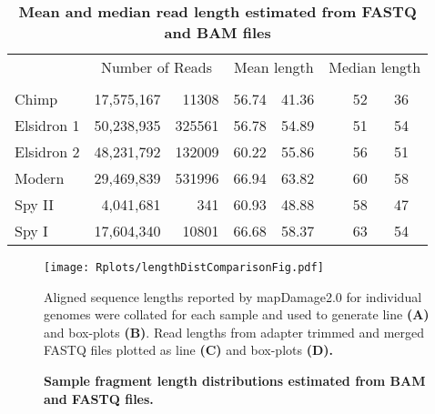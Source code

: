 \documentclass[12pt, a4paper]{article}
\renewcommand{\arraystretch}{1.2}
\newcommand{\ra}[1]{\renewcommand{\arraystretch}{#1}}
\begin{document}
\begin{table*}[!h]\centering\footnotesize %
\ra{1.3}
\setlength{\tabcolsep}{8pt} %
\centering
\caption[Mean and median read length estimated from FASTQ and BAM files]{\textbf{Mean and median read length estimated from FASTQ and BAM files}}\label{table:fastqVSbamLength}
\begin{tabular}{@{}lrrrrrc@{}}
	\toprule
	& \multicolumn{2}{c}{Number of Reads} & \multicolumn{2}{c}{Mean length} & \multicolumn{2}{c}{Median length} \\
	\cmidrule(lr){2-3} \cmidrule(lr){4-5} \cmidrule(lr){6-7}
	\thead{Sample ID} & \thead{FASTQ} & \thead{BAM} & \thead{FASTQ} & \thead{BAM} & \thead{FASTQ} & \thead{BAM} \\
	\midrule
	Chimp & 17,575,167 & 11308 & 56.74 & 41.36 & 52 & 36 \\ 
  	Elsidron 1 & 50,238,935 & 325561 & 56.78 & 54.89 & 51 & 54 \\ 
  	Elsidron 2 & 48,231,792 & 132009 & 60.22 & 55.86 & 56 & 51 \\ 
  	Modern & 29,469,839 & 531996 & 66.94 & 63.82 & 60 & 58 \\ 
  	Spy II & 4,041,681 & 341 & 60.93 & 48.88 & 58 & 47 \\ 
  	Spy I & 17,604,340 & 10801 & 66.68 & 58.37 & 63 & 54 \\ 
	\bottomrule
\end{tabular}
\end{table*}

\begin{figure}[ht]
	\setlength\abovecaptionskip{8pt}
	\begin{center}
	\texttt{[image: Rplots/lengthDistComparisonFig.pdf]}
	\end{center}
	\caption[Sample fragment length distributions estimated from BAM and FASTQ files]{\textbf{Sample fragment length distributions estimated from BAM and FASTQ files.}}\small{Aligned sequence lengths reported by mapDamage2.0 for individual genomes were collated for each sample and used to generate line \textbf{(A)} and box-plots \textbf{(B)}. Read lengths from adapter trimmed and merged FASTQ files plotted as line \textbf{(C)} and box-plots \textbf{(D).}}\label{fig:lengthDistCompare}
\end{figure}
\clearpage


\end{document}
